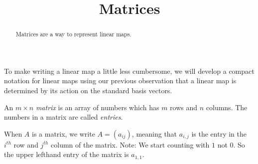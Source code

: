 \documentclass{ximera}
\title{Matrices}
\begin{document}
\begin{abstract}
  Matrices are a way to represent linear maps.
\end{abstract}
\maketitle


To make writing a linear map a little less cumbersome, we will develop a compact notation for linear maps using our previous observation that a linear 
map is determined by its action on the standard basis vectors.
	
\begin{definition}
  An $m \times n$ \textit{matrix} is an array of numbers which has $m$ rows and $n$ columns.  The numbers in a matrix are called \textit{entries}.

  When $A$ is a matrix, we write $A = (a_{ij})$, meaning that $a_{i,j}$ is the entry in the $i^{th}$  row and $j^{th}$ column of the matrix.  Note:  We start counting
  with $1$ not $0$.  So the upper lefthand entry of the matrix is $a_{1,1}$.
\end{definition}
\end{document}
